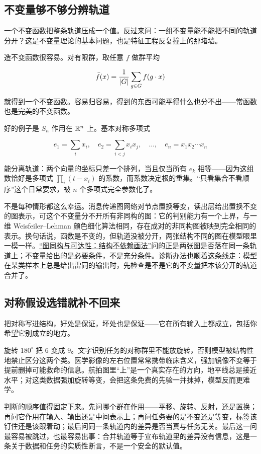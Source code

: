 \subsection{不变量够不够分辨轨道}

一个不变函数把整条轨道压成一个值。反过来问：一组不变量能不能把不同的轨道分开？这是不变量理论的基本问题，也是特征工程反复撞上的那堵墙。

造不变函数很容易。对有限群，取任意 \(f\) 做群平均

\[
\bar f(x)=\frac1{\left|G\right|}\sum_{g\in G}f(g\cdot x)
\]

就得到一个不变函数。容易归容易，得到的东西可能平得什么也分不出——常函数也是完美的不变函数。

好的例子是 \(S_n\) 作用在 \(\mathbb{R}^n\) 上。基本对称多项式

\[
e_1=\sum_i x_i,\quad e_2=\sum_{i<j}x_ix_j,\quad\ldots,\quad e_n=x_1x_2\cdots x_n
\]

能分离轨道：两个向量的坐标只差一个排列，当且仅当所有 \(e_k\) 相等——因为这组数恰好是多项式 \(\prod_i(t-x_i)\) 的系数，而系数决定根的重集。``只看集合不看顺序''这个日常要求，被 \(n\) 个多项式完全参数化了。

不是每种情形都这么幸运。消息传递图网络对节点置换等变，读出层给出置换不变的图表示，可这个不变量分不开所有非同构的图：它的判别能力有一个上界，与一维 Weisfeiler--Lehman 颜色细化算法相同，存在成对的非同构图被映到完全相同的表示。换句话说，函数是不变的，但轨道没被分开，两张结构不同的图在模型眼里一模一样。\hyperref[sec:04-Discrete-Mathematics/03-Graph-Theory/10]{``图同构与可达性：结构不依赖画法''}问的正是两张图是否落在同一条轨道上；不变量给出的是必要条件，不是充分条件。诊断办法也顺着这条线走：模型在某类样本上总是给出雷同的输出时，先检查是不是它的不变量把本该分开的轨道合并了。

\subsection{对称假设选错就补不回来}

把对称写进结构，好处是保证，坏处也是保证——它在所有输入上都成立，包括你希望它别成立的地方。

旋转 \(180^\circ\) 把 \(6\) 变成 \(9\)。文字识别任务的对称群里不能放旋转，否则模型被结构性地禁止区分这两个类。医学影像的左右位置常常携带临床含义，强加镜像不变等于提前删掉可能救命的信息。航拍图里``上''是一个真实存在的方向，地平线总是接近水平；对这类数据强加旋转等变，会把这条免费的先验一并抹掉，模型反而更难学。

判断的顺序值得固定下来。先问哪个群在作用——平移、旋转、反射，还是置换；再问它作用在输入、输出还是中间表示上；再问任务要的是不变还是等变，标签该钉住还是该跟着动；最后问同一条轨道内的差异是否当真与任务无关。最后这一问最容易被跳过，也最容易出事：合并轨道等于宣布轨道里的差异没有信息，这是一条关于数据和任务的实质性断言，不是一个安全的默认值。

